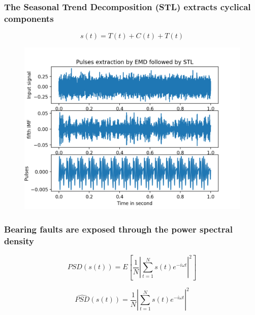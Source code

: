 \documentclass{beamer}
\begin{document}
\begin{frame}
	\frametitle{The Seasonal Trend Decomposition (STL) extracts cyclical components }
	\begin{equation}
		s(t) = T(t) + C(t) + T(t)
	\end{equation}
	\begin{figure}[H]
		\centering
		\includegraphics[width=0.6\linewidth]{emd-stl}
	\end{figure}
\end{frame}




\begin{frame}
	\frametitle{Bearing faults are exposed through the power spectral density }
	\begin{equation}\label{eq:psd}
	PSD\left(s(t)\right) = E\left[ \frac{1}{N} \left\vert \sum_{t=1}^{N} s(t)e^{-i\omega t}\right\vert^{2}   \right]
	\end{equation}

	\begin{equation}
	\widehat{PSD}\left(s(t)\right) =  \frac{1}{N} \left\vert \sum_{t=1}^{N} s(t)e^{-i\omega t}\right\vert^{2}
	\end{equation}
	
\end{frame}

\end{document}
